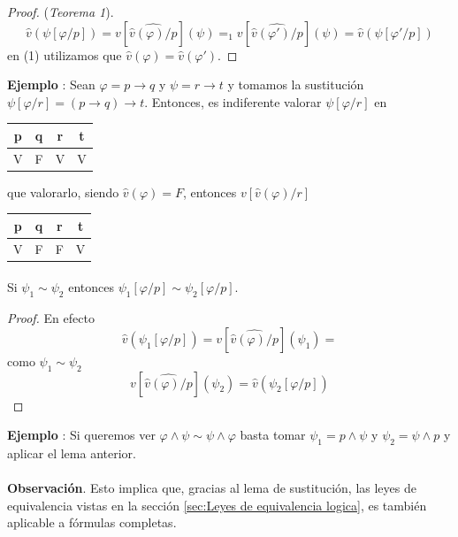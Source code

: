 \begin{proof}(\textit{Teorema 1}). 
\[ \widehat{v}(\psi[\varphi/p]) = v[\widehat{\widehat{v}(\varphi)/p}](\psi) =_{1} v[\widehat{\widehat{v}(\varphi')/p}](\psi) = \widehat{v}(\psi[\varphi'/p])\]
en (1) utilizamos que $\widehat{v}(\varphi)=\widehat{v}(\varphi')$.
\end{proof}

\addtocounter{ej}{1} %
\textbf{Ejemplo }: Sean $\varphi=p \rightarrow q$ y $\psi=r \rightarrow t$ y tomamos la sustitución $\psi[\varphi/r]=(p \rightarrow q) \rightarrow t$. Entonces, es indiferente valorar $\psi[\varphi/r]$ en
 
\begin{center}
\begin{tabular}{|c|c|c|c|}
\hline 
\textbf{p} & \textbf{q} & \textbf{r} & \textbf{t} \\ 
\hline 
V & F & V & V \\ 
\hline 
\end{tabular}
\end{center}
 
que valorarlo, siendo $\widehat{v}(\varphi)=F$, entonces $v[\widehat{v}(\varphi)/r]$

\begin{center}
\begin{tabular}{|c|c|c|c|}
\hline 
\textbf{p} & \textbf{q} & \textbf{r} & \textbf{t} \\ 
\hline 
V & F & F & V \\ 
\hline 
\end{tabular} 
\end{center}
\paragraph{}
\begin{lemma}
Si $\psi_1 \sim \psi_2$ entonces $\psi_1[\varphi/p] \sim \psi_2[\varphi/p]$.
\end{lemma}
\begin{proof}
En efecto
\[ \widehat{v}(\psi_1[\varphi/p]) = v[\widehat{\widehat{v}(\varphi)/p}](\psi_1)=\]
como $\psi_1 \sim \psi_2$
\[  v[\widehat{\widehat{v}(\varphi)/p}](\psi_2)=\widehat{v}(\psi_2[\varphi/p]) \]
\end{proof}

\addtocounter{ej}{1} %
\textbf{Ejemplo }: Si queremos ver $\varphi \wedge \psi \sim \psi \wedge \varphi$ basta tomar $\psi_1= p \wedge \psi$ y $\psi_2= \psi \wedge p$ y aplicar el lema anterior. 
\paragraph{}
\textbf{Observación}. Esto implica que, gracias al lema de sustitución, las leyes de equivalencia vistas en la sección \ref{sec:Leyes de equivalencia logica}, es también aplicable a fórmulas completas. 
